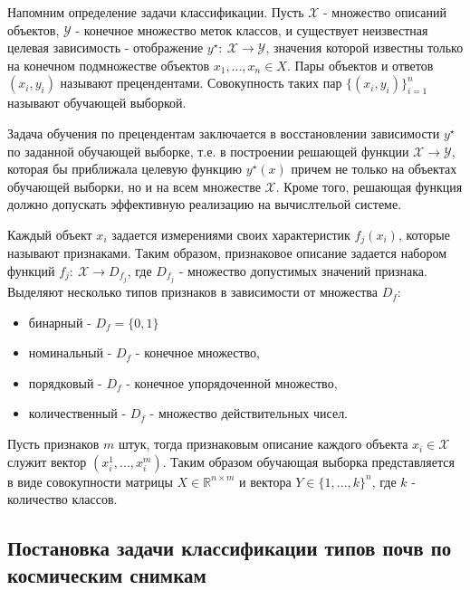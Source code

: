 \documentclass[14pt]{extarticle}
\begin{document}
\par
Напомним определение задачи классификации. 
Пусть $\mathcal{X}$ - множество описаний объектов, 
$\mathcal{Y}$ - конечное множество меток классов, и 
существует неизвестная целевая зависимость - отображение 
$y^\star:\ \mathcal{X} \to \mathcal{Y}$, 
значения которой известны только на конечном подмножестве объектов
$x_1, ..., x_n \in X$. Пары объектов и ответов $(x_i, y_i)$ называют прецендентами.
Совокупность таких пар $\{(x_i, y_i)\}_{i=1}^n$ называют обучающей выборкой.
\par
Задача обучения по прецендентам заключается в восстановлении зависимости $y^\star$
по заданной обучающей выборке, т.е. в построении решающей функции 
$\mathcal{X} \to \mathcal{Y}$, которая бы
приближала целевую функцию $y^\star(x)$ причем не только на объектах обучающей выборки,
но и на всем множестве $\mathcal{X}$. Кроме того, решающая функция должно допускать эффективную
реализацию на вычислтельой системе.
\par
Каждый объект $x_i$ задается измерениями своих характеристик $f_j(x_i)$, 
которые называют признаками. Таким образом, признаковое описание задается набором функций
$f_j:\ \mathcal{X}\to D_{f_j}$, где $D_{f_j}$ - множество допустимых значений признака.
Выделяют несколько типов признаков в зависимости от множества $D_f$:
\begin{itemize} 
    \item бинарный - $D_f=\{0,1\}$
    \item номинальный - $D_f$ - конечное множество,
    \item порядковый - $D_f$ - конечное упорядоченной множество,
    \item количественный - $D_f$ - множество действительных чисел.
\end{itemize}
Пусть признаков $m$ штук, тогда признаковым описание каждого объекта 
$x_i \in \mathcal{X}$ служит вектор $(x_i^1, ..., x_i^m)$. 
Таким образом обучающая выборка представляется в виде совокупности матрицы 
$X \in \mathbb{R}^{n \times m}$ и вектора $Y \in \{1, ..., k\}^n$, где 
$k$ - количество классов.

\subsection{Постановка задачи классификации типов почв по космическим снимкам}
\end{document}
